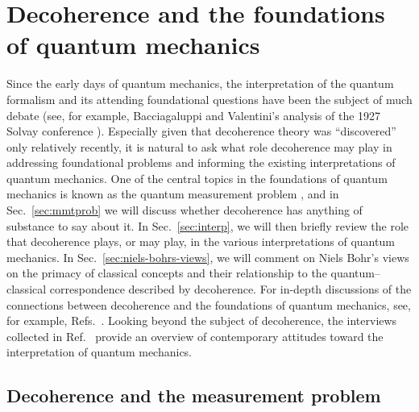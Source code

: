 \documentclass[3p,sort&compress,12pt]{elsarticle}
\begin{document}
\section{\label{sec:impl-found-quant}Decoherence and the foundations of quantum mechanics}

Since the early days of quantum mechanics, the interpretation of the quantum formalism and its attending foundational questions have been the subject of much debate (see, for example, Bacciagaluppi and Valentini's analysis of the 1927 Solvay conference \cite{Bacciagaluppi:2006:yq}).  Especially given that decoherence theory was ``discovered'' only relatively recently, it is natural to ask what role decoherence may play in addressing foundational problems and informing the existing interpretations of quantum mechanics. One of the central topics in the foundations of quantum mechanics is known as the quantum measurement problem \cite{Bub:1997:iq,Wigner:1963:yt,Fine:1970:iq,Schlosshauer:2003:tv,Wallace:2008:ii,Schlosshauer:2011:ee}, and in Sec.~\ref{sec:mmtprob} we will discuss whether decoherence has anything of substance to say about it. In Sec.~\ref{sec:interp}, we will then briefly review the role that decoherence plays, or may play, in the various interpretations of quantum mechanics. In Sec.~\ref{sec:niels-bohrs-views}, we will comment on Niels Bohr's views on the primacy of classical concepts and their relationship to the quantum--classical correspondence described by decoherence. For in-depth discussions of the connections between decoherence and the foundations of quantum mechanics, see, for example, Refs.~\cite{Bacciagaluppi:2003:yz,Schlosshauer:2003:tv,Schlosshauer:2006:rw,Schlosshauer:2007:un}. Looking beyond the subject of decoherence, the interviews collected in Ref.~\cite{Schlosshauer:2011:ee} provide an overview of contemporary attitudes toward the interpretation of quantum mechanics.

\subsection{Decoherence and the measurement problem\label{sec:mmtprob}}
\end{document}
